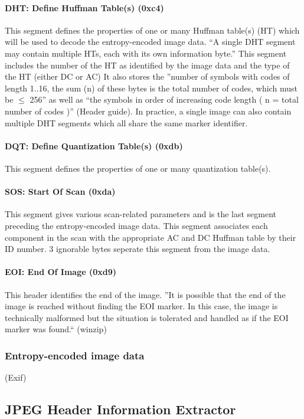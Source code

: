 \documentclass[oneside]{ecsgdp}         %
\begin{document}
\paragraph*{DHT: Define Huffman Table(s) (0xc4)}
This segment defines the properties of one or many Huffman table(s) (HT) which will be used to decode the entropy-encoded image data. ``A single DHT segment may contain multiple HTs, each with its own information byte.'' This segment includes the number of the HT as identified by the image data and the type of the HT (either DC or AC) It also stores the ''number of symbols with codes of length 1..16, the sum (n) of these bytes is the total number of codes, which must be $\leq$ 256'' as well as ``the symbols in order of increasing code length ( n = total number of codes )'' (Header guide). In practice, a single image can also contain multiple DHT segments which all share the same marker identifier. 

\paragraph*{DQT: Define Quantization Table(s) (0xdb)}
This segment defines the properties of one or many quantization table(s).

\paragraph*{SOS: Start Of Scan (0xda)}
This segment gives various scan-related parameters and is the last segment preceding the entropy-encoded image data. This segment associates each component in the scan with the appropriate AC and DC Huffman table by their ID number. 3 ignorable bytes seperate this segment from the image data. 

\paragraph*{EOI: End Of Image (0xd9)}
This header identifies the end of the image. ''It is possible that the end of the image is reached without finding the EOI marker. In this case, the image is technically malformed but the situation is tolerated and handled as if the EOI marker was found.`` (winzip) 

\subsubsection{Entropy-encoded image data}
(Exif)

\subsection{JPEG Header Information Extractor}
\end{document}
